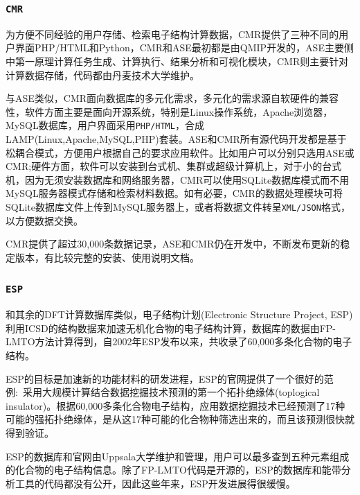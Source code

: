 \frame
{
\frametitle{\tt{CMR}}
为方便不同经验的用户存储、检索电子结构计算数据，\textrm{CMR}提供了三种不同的用户界面\textrm{PHP/HTML和Python}\cite{CMR_URL}，\textrm{CMR}和\textrm{ASE}最初都是由\textrm{QMIP}开发的\cite{CSE14-51_2012}，\textrm{ASE}主要侧中第一原理计算任务生成、计算执行、结果分析和可视化模块，\textrm{CMR}则主要针对计算数据存储，代码都由丹麦技术大学维护。

与\textrm{ASE}类似，\textrm{CMR}面向数据库的多元化需求，多元化的需求源自软硬件的兼容性，软件方面主要是面向开源系统，特别是\textrm{Linux}操作系统，\textrm{Apache}浏览器，\textrm{MySQL}数据库，用户界面采用\texttt{PHP/HTML}，合成\textrm{LAMP}(\textrm{Linux,Apache,MySQL,PHP})套装。\textrm{ASE}和\textrm{CMR}所有源代码开发都是基于松耦合模式，方便用户根据自己的要求应用软件。比如用户可以分别只选用\textrm{ASE}或\textrm{CMR};硬件方面，软件可以安装到台式机、集群或超级计算机上，对于小的台式机，因为无须安装数据库和网络服务器，\textrm{CMR}可以使用\textrm{SQLite}数据库模式而不用\textrm{MySQL}服务器模式存储和检索材料数据。如有必要，\textrm{CMR}的数据处理模块可将\textrm{SQLite}数据库文件上传到\textrm{MySQL}服务器上，或者将数据文件转呈\texttt{XML/JSON}格式，以方便数据交换。

\textrm{CMR}提供了超过30,000条数据记录，\textrm{ASE}和\textrm{CMR}仍在开发中，不断发布更新的稳定版本，有比较完整的安装、使用说明文档。
}

\frame
{
\frametitle{\tt{ESP}}
和其余的\textrm{DFT}计算数据库类似，电子结构计划\textrm{(Electronic Structure Project, ESP)}利用\textrm{ICSD}的结构数据来加速无机化合物的电子结构计算\cite{ESP_URL,CMS44-1042_2009}，数据库的数据由\textrm{FP-LMTO}方法计算得到，自2002年\textrm{ESP}发布以来，共收录了60,000多条化合物的电子结构。

\textrm{ESP}的目标是加速新的功能材料的研发进程，\textrm{ESP}的官网提供了一个很好的范例:~采用大规模计算结合数据挖掘技术预测的第一个拓扑绝缘体\textrm{(toplogical insulator)}。根据60,000多条化合物电子结构，应用数据挖掘技术已经预测了17种可能的强拓扑绝缘体\cite{arXiv1007-4838_2010,APR6-31_2014}，是从这17种可能的化合物种筛选出来的，而且该预测很快就得到验证。

\textrm{ESP}的数据库和官网由\textrm{Uppsala}大学维护和管理，用户可以最多查到五种元素组成的化合物的电子结构信息。除了\textrm{FP-LMTO}代码是开源的，\textrm{ESP}的数据库和能带分析工具的代码都没有公开，因此这些年来，\textrm{ESP}开发进展得很缓慢。
}

